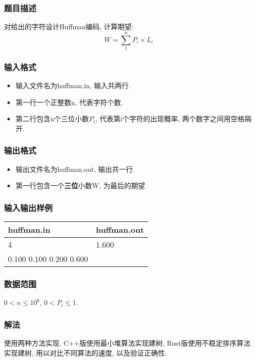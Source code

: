 \subsubsection{题目描述}
对给出的字符设计Huffman编码, 计算期望:
\begin{equation}
	W = \sum_1^n{P_i \times L_i}
	\label{eq:huf-exp}
\end{equation}
\subsubsection{输入格式}
\begin{itemize}
	\item 输入文件名为huffman.in, 输入共两行.
	\item 第一行一个正整数n, 代表字符个数.
	\item 第二行包含n个三位小数$P_i$, 代表第i个字符的出现概率,
	      两个数字之间用空格隔开.
\end{itemize}

\subsubsection{输出格式}
\begin{itemize}
	\item 输出文件名为huffman.out, 输出共一行.
	\item 第一行包含一个\textbf{三位}小数W, 为最后的期望.
\end{itemize}

\subsubsection{输入输出样例}
\begin{table}[h!]
	\centering
	\begin{tabular}{|l|l|}
		\hline
		huffman.in              & huffman.out \\
		\hline
		4                       & 1.600       \\
		0.100 0.100 0.200 0.600 & ~           \\
		\hline
	\end{tabular}
\end{table}

\subsubsection{数据范围}
$0 < n \leq 10^6$,
$0<P_i \leq 1$.

\subsubsection{解法}
使用两种方法实现. C++版使用最小堆算法实现建树, Rust版使用不稳定排序算法实现建树,
用以对比不同算法的速度, 以及验证正确性.

